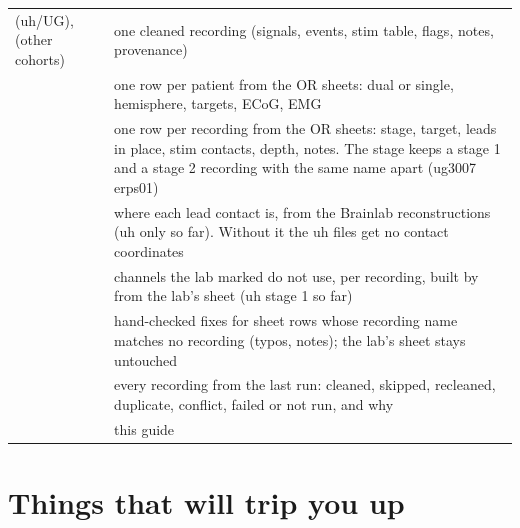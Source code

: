 \begin{tabularx}{\textwidth}{@{}>{\raggedright\arraybackslash}p{} Y@{}}
\toprule
{} (uh/UG),  (other cohorts) & one cleaned recording (signals, events, stim table, flags, notes, provenance) \\
 & one row per patient from the OR sheets: dual or single, hemisphere, targets, ECoG, EMG \\
 & one row per recording from the OR sheets: stage, target, leads in place, stim contacts, depth, notes. The stage keeps a stage 1 and a stage 2 recording with the same name apart (ug3007 erps01) \\
 & where each lead contact is, from the Brainlab reconstructions (uh only so far). Without it the uh files get no contact coordinates \\
 & channels the lab marked do not use, per recording, built by  from the lab's sheet (uh stage 1 so far) \\
 & hand-checked fixes for sheet rows whose recording name matches no recording (typos, notes); the lab's sheet stays untouched \\
 & every recording from the last run: cleaned, skipped, recleaned, duplicate, conflict, failed or not run, and why \\
 & this guide \\
\bottomrule
\end{tabularx}

\section{Things that will trip you up}

